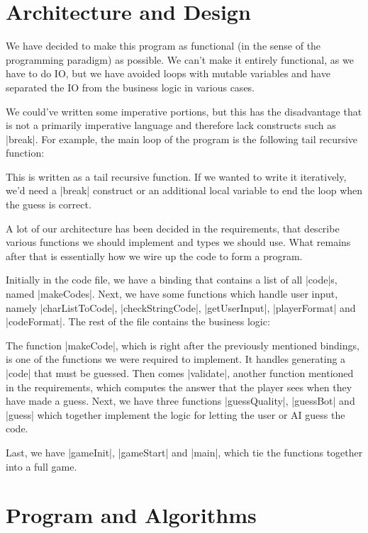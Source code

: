 \documentclass[a4paper]{article}
\begin{document}
\section{Architecture and Design}

We have decided to make this program as functional (in the sense of the programming paradigm) as possible. We can't make it entirely functional, as we have to do IO, but we have avoided loops with mutable variables and have separated the IO from the business logic in various cases.

We could've written some imperative portions, but this has the disadvantage that \Fsh is not a primarily imperative language and therefore lack constructs such as \code|break|. For example, the main loop of the program is the following tail recursive function:


This is written as a tail recursive function. If we wanted to write it iteratively, we'd need a \code|break| construct or an additional local variable to end the loop when the guess is correct.

A lot of our architecture has been decided in the requirements, that describe various functions we should implement and types we should use. What remains after that is essentially how we wire up the code to form a program.

\sloppy Initially in the code file, we have a binding that contains a list of all \code|code|s, named \code|makeCodes|. Next, we have some functions which handle user input, namely \code|charListToCode|, \code|checkStringCode|, \code|getUserInput|, \code|playerFormat| and \code|codeFormat|. The rest of the file contains the business logic:

The function \code|makeCode|, which is right after the previously mentioned bindings, is one of the functions we were required to implement. It handles generating a \code|code| that must be guessed. Then comes \code|validate|, another function mentioned in the requirements, which computes the answer that the player sees when they have made a guess. Next, we have three functions \code|guessQuality|, \code|guessBot| and \code|guess| which together implement the logic for letting the user or AI guess the code.

Last, we have \code|gameInit|, \code|gameStart| and \code|main|, which tie the functions together into a full game.

\section{Program and Algorithms}
\end{document}
